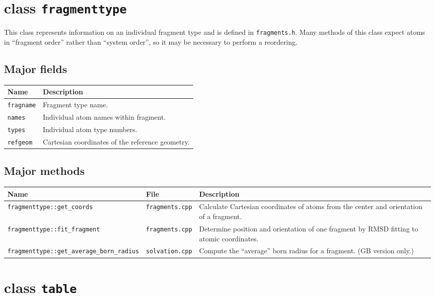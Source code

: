 \documentclass{article}      %
\begin{document}
\section{class \texttt{fragmenttype}}

This class represents information on an individual fragment type and is defined in \verb+fragments.h+.  Many methods of this class expect atoms in ``fragment order'' rather than ``system order'', so it may be necessary to perform a reordering.  

\subsection{Major fields}
\begin{tabular}{|p{5cm}|p{11cm}|}
\hline
Name &  Description \\
\hline
\verb+fragname+ & Fragment type name. \\
\hline
\verb+names+ & Individual atom names within fragment. \\
\hline
\verb+types+ & Individual atom type numbers. \\
\hline
\verb+refgeom+ & Cartesian coordinates of the reference geometry. \\
\hline
\end{tabular}

\subsection{Major methods}

\begin{tabular}{|p{7cm}|p{3cm}|p{6cm}|}
\hline
Name & File & Description \\
\hline
\verb+fragmenttype::get_coords+ & \verb+fragments.cpp+ & Calculate Cartesian coordinates of atoms from the center and orientation of a fragment. \\
\hline
\verb+fragmenttype::fit_fragment+ & \verb+fragments.cpp+ & Determine position and orientation of one fragment by RMSD fitting to atomic coordinates. \\
\hline
\verb+fragmenttype::get_average_born_radius+ & \verb+solvation.cpp+ & Compute the ``average'' born radius for a fragment. (GB version only.) \\
\hline
\end{tabular}

\section{class \texttt{table}}
\end{document}

